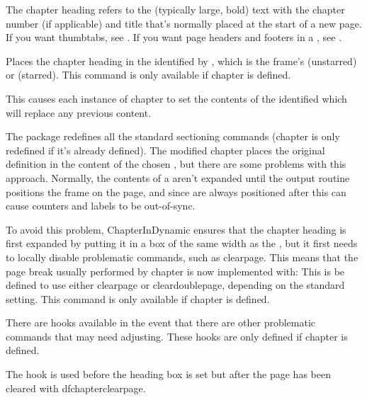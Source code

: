 \documentclass[fontsize=12pt]{scrbook}
\newcommand{\hookdef}[1]{\optiondef*{hook.#1}}
\begin{document}
\begin{information}
The chapter heading refers to the (typically large, bold) text with the chapter number (if
applicable) and title that's normally placed at the start of a new
page. If you want thumbtabs, see .
If you want page headers and footers in a , 
see .
\end{information}

Places the chapter heading in the 
identified by , which is the frame's  (unstarred)
or  (starred). This command is only available if
\gls{chapter} is defined. 

\begin{important}
This causes each instance of \gls{chapter} to set
the contents of the identified  which will
replace any previous content.
\end{important}

The  package redefines all the standard sectioning commands
(\gls{chapter} is only redefined if it's already defined). The
modified \gls{chapter} places the original definition in the content
of the chosen , but there are some problems with
this approach. Normally, the contents of a 
aren't expanded until the output routine positions the frame on the
page, and since  are always positioned after
 this can cause counters and labels to be
out-of-sync.

To avoid this problem, \gls{ChapterInDynamic} ensures
that the chapter heading is first expanded by putting it in a box of
the same width as the , but it first needs to
locally disable problematic commands, such as \gls{clearpage}.
This means that the page break usually performed by \gls{chapter} is
now implemented with:
This is be defined to use either \gls{clearpage} or
\gls{cleardoublepage}, depending on the standard 
setting. 
This command is only available if \gls{chapter} is defined.

There are hooks available in the event that there are other
problematic commands that may need adjusting. These hooks are only
defined if \gls{chapter} is defined.

\hookdef{flowfram/chaphead/before}
The  hook is used before the heading
box is set but after the page has been cleared with
\gls{dfchapterclearpage}.
\end{document}
